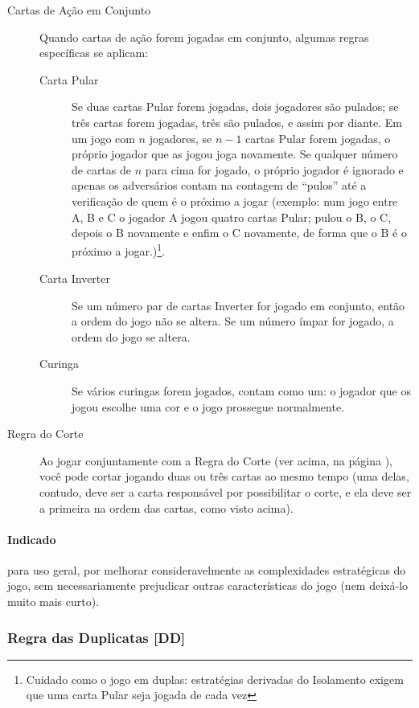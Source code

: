 \begin{description}
\item[Cartas de Ação em Conjunto]{Quando cartas de ação forem jogadas em conjunto, algumas regras específicas se aplicam:
\begin{description}
\item[Carta Pular]{Se duas cartas Pular forem jogadas, dois jogadores são pulados; se três cartas forem jogadas, três são pulados, e assim por diante. Em um jogo com $n$ jogadores, se $n - 1$ cartas Pular forem jogadas, o próprio jogador que as jogou joga novamente. Se qualquer número de cartas de $n$ para cima for jogado, o próprio jogador é ignorado e apenas os adversários contam na contagem de ``pulos'' até a verificação de quem é o próximo a jogar (exemplo: num jogo entre A, B e C o jogador A jogou quatro cartas Pular; pulou o B, o C, depois o B novamente e enfim o C novamente, de forma que o B é o próximo a jogar.)\footnote{Cuidado como o jogo em duplas: estratégias derivadas do Isolamento exigem que uma carta Pular seja jogada de cada vez}.}
\item[Carta Inverter]{Se um número par de cartas Inverter for jogado em conjunto, então a ordem do jogo não se altera. Se um número ímpar for jogado, a ordem do jogo se altera.}
\item[Curinga]{Se vários curingas forem jogados, contam como um: o jogador que os jogou escolhe uma cor e o jogo prossegue normalmente.}
\end{description}
}
\item[Regra do Corte]{Ao jogar conjuntamente com a Regra do Corte (ver acima, na página \pageref{regradocorte}), você pode cortar jogando duas ou três cartas ao mesmo tempo (uma delas, contudo, deve ser a carta responsável por possibilitar o corte, e ela deve ser a primeira na ordem das cartas, como visto acima).}
\end{description}

\paragraph{Indicado} 

para uso geral, por melhorar consideravelmente as complexidades estratégicas do jogo, sem necessariamente prejudicar outras características do jogo (nem deixá-lo muito mais curto).

\subsubsection{Regra das Duplicatas [DD]}

